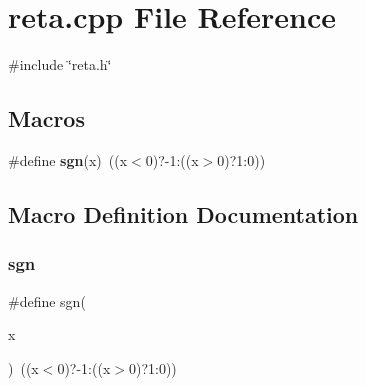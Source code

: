 \section{reta.\+cpp File Reference}
\label{reta_8cpp}
{\ttfamily \#include \char`\"{}reta.\+h\char`\"{}}\newline
\subsection*{Macros}
\begin{DoxyCompactItemize}
\item 
\#define \textbf{ sgn}(x)~((x$<$0)?-\/1\+:((x$>$0)?1\+:0))
\end{DoxyCompactItemize}


\subsection{Macro Definition Documentation}
\mbox{\label{reta_8cpp_ae1b5a554c1d4d97654c06032a92f800a}} 
\subsubsection{sgn}
{\footnotesize\ttfamily \#define sgn(\begin{DoxyParamCaption}\item[{}]{x }\end{DoxyParamCaption})~((x$<$0)?-\/1\+:((x$>$0)?1\+:0))}

